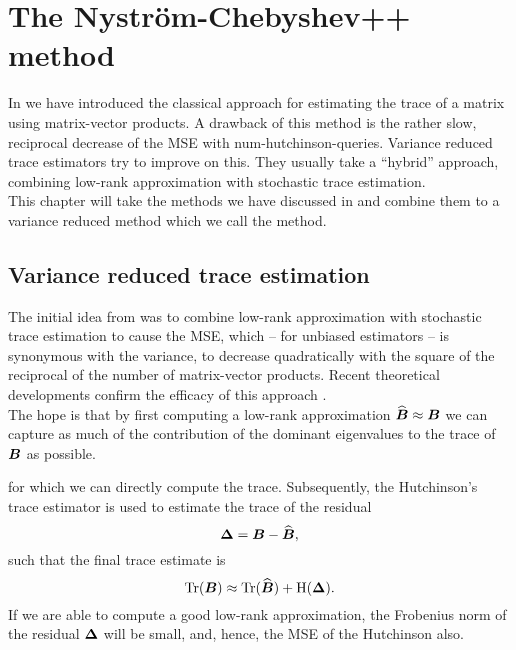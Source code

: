 \chapter{The Nystr\"om-Chebyshev++ method}
\label{chp:4-nystromchebyshev}

In  we have introduced the
classical approach for estimating the trace of a matrix using matrix-vector
products. A drawback of this method is the rather slow, reciprocal decrease of
the \gls{MSE} with \gls{num-hutchinson-queries}. Variance reduced trace estimators
try to improve on this. They usually take a \enquote{hybrid} approach, combining
low-rank approximation with stochastic trace estimation.\\

This chapter will take the methods we have discussed in 
and  combine them to a variance reduced method which
we call the  method.


\section{Variance reduced trace estimation}
\label{sec:4-nystromchebyshev-hybrid}

The initial idea from \cite{lin2017randomized} was to combine low-rank approximation
with stochastic trace estimation to cause the \gls{MSE}, which -- for unbiased estimators
-- is synonymous with the variance, to decrease quadratically with the square
of the reciprocal of the number of matrix-vector products.
Recent theoretical developments confirm the
efficacy of this approach \cite{meyer2021hutch,persson2022hutch}.\\

The hope is that by first computing a low-rank approximation $\widehat{\boldsymbol{B}} \approx \boldsymbol{B}$
we can capture as much of the contribution of the dominant eigenvalues to the
trace of $\boldsymbol{B}$ as possible.


for which we can directly compute the trace. Subsequently, the
Hutchinson's trace estimator 
is used to estimate the trace of the residual
\begin{equation}
    \boldsymbol{\Delta} = \boldsymbol{B} - \widehat{\boldsymbol{B}},
    \label{equ:4-nystromchebyshev-residual}
\end{equation}
such that the final trace estimate is
\begin{equation}
    \operatorname{Tr}(\boldsymbol{B}) \approx \operatorname{Tr}(\widehat{\boldsymbol{B}}) + \operatorname{H}(\boldsymbol{\Delta}).
    \label{equ:4-nystromchebyshev-hutch-pp}
\end{equation}
If we are able to compute a good low-rank approximation, the Frobenius norm
of the residual $\boldsymbol{\Delta}$ will be small, and, hence, the \gls{MSE}
of the Hutchinson  also.

